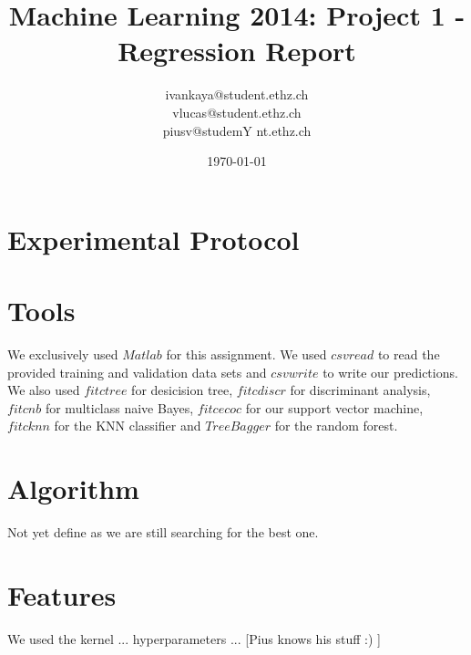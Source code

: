 \documentclass[a4paper, 11pt]{article}
\title{Machine Learning 2014: Project 1 - Regression Report}
\author{ivankaya@student.ethz.ch\\vlucas@student.ethz.ch\\ piusv@studemY nt.ethz.ch\\}
\date{\today}
\begin{document}
\maketitle

\section*{Experimental Protocol}

\section{Tools}

We exclusively used $Matlab$ for this assignment.
We used $csvread$ to read the provided training and validation data sets and
$csvwrite$ to write our predictions. We also used $fitctree$ for desicision tree, $fitcdiscr$ for discriminant analysis, $fitcnb$ for multiclass naive Bayes, $fitcecoc$ for our support vector machine, $fitcknn$ for the KNN classifier and $TreeBagger$ for the random forest.


\section{Algorithm}

Not yet define as we are still searching for the best one.


\section{Features}

We used the kernel ... hyperparameters ... [Pius knows his stuff :) ]
\end{document}
